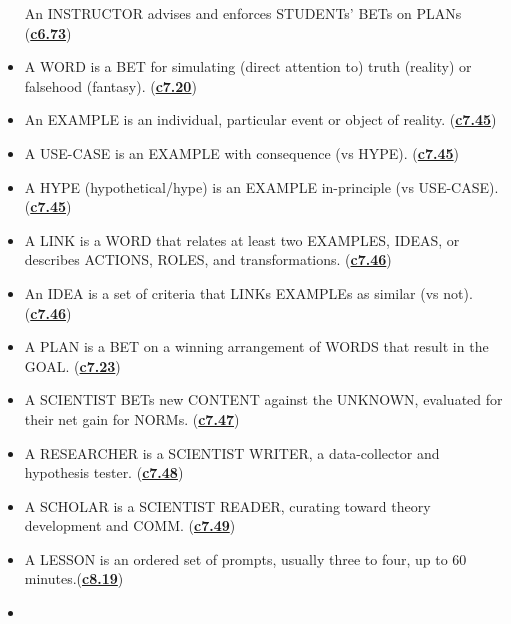 \documentclass[
]{book}
\begin{document}
\begin{itemize}
  An INSTRUCTOR advises and enforces STUDENTs' BETs on PLANs (\protect\hyperlink{instructor}{\textbf{c6.73}})\\
\item
  A WORD is a BET for simulating (direct attention to) truth (reality) or falsehood (fantasy). (\protect\hyperlink{word-as-bet}{\textbf{c7.20}})\\
\item
  An EXAMPLE is an individual, particular event or object of reality. (\protect\hyperlink{example-and-idea}{\textbf{c7.45}})\\
\item
  A USE-CASE is an EXAMPLE with consequence (vs HYPE). (\protect\hyperlink{example-and-idea}{\textbf{c7.45}})\\
\item
  A HYPE (hypothetical/hype) is an EXAMPLE in-principle (vs USE-CASE).(\protect\hyperlink{example-and-idea}{\textbf{c7.45}})\\
\item
  A LINK is a WORD that relates at least two EXAMPLES, IDEAS, or describes ACTIONS, ROLES, and transformations. (\protect\hyperlink{example-and-idea}{\textbf{c7.46}})\\
\item
  An IDEA is a set of criteria that LINKs EXAMPLEs as similar (vs not). (\protect\hyperlink{example-and-idea}{\textbf{c7.46}})\\
\item
  A PLAN is a BET on a winning arrangement of WORDS that result in the GOAL. (\protect\hyperlink{word-as-bet}{\textbf{c7.23}})\\
\item
  A SCIENTIST BETs new CONTENT against the UNKNOWN, evaluated for their net gain for NORMs. (\protect\hyperlink{role-scientist}{\textbf{c7.47}})\\
\item
  A RESEARCHER is a SCIENTIST WRITER, a data-collector and hypothesis tester. (\protect\hyperlink{role-scientist}{\textbf{c7.48}})\\
\item
  A SCHOLAR is a SCIENTIST READER, curating toward theory development and COMM. (\protect\hyperlink{role-scientist}{\textbf{c7.49}})\\
\item
  A LESSON is an ordered set of prompts, usually three to four, up to 60 minutes.(\protect\hyperlink{lessons-1}{\textbf{c8.19}})\\
\item

\end{itemize}
\end{document}
